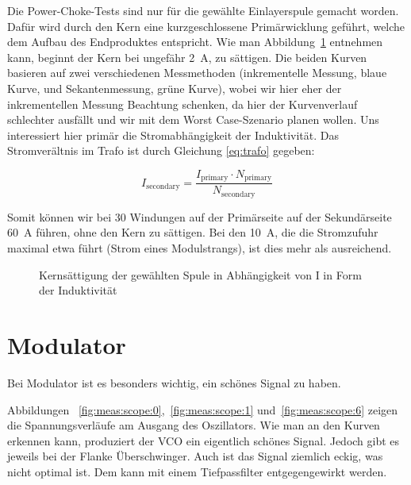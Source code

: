 Die  Power-Choke-Tests sind  nur  f\"ur die  gew\"ahlte Einlayerspule  gemacht
worden. Daf\"ur  wird durch  den Kern  eine kurzgeschlossene  Prim\"arwicklung
gef\"uhrt,   welche   dem   Aufbau  des   Endproduktes   entspricht. Wie   man
Abbildung~\ref{fig:meas:coupling:coil:power_choke:1}  entnehmen kann,  beginnt
der  Kern bei  ungef\"ahr  \SI{2}{\ampere}, zu  s\"attigen. Die beiden  Kurven
basieren   auf  zwei   verschiedenen   Messmethoden  (inkrementelle   Messung,
blaue  Kurve,  und  Sekantenmessung,  gr\"une  Kurve),  wobei  wir  hier  eher
der  inkrementellen  Messung Beachtung  schenken,  da  hier der  Kurvenverlauf
schlechter ausf\"allt und  wir mit dem Worst  Case-Szenario planen wollen. Uns
interessiert  hier prim\"ar  die  Stromabh\"angigkeit der  Induktivit\"at. Das
Stromver\"altnis im Trafo ist durch Gleichung \ref{eq:trafo} gegeben:

\begin{equation}\label{eq:trafo}
    I_{\mathrm{secondary}} = \frac{I_{\mathrm{primary}} \cdot N_{\mathrm{primary}}}{N_{\mathrm{secondary}}}
\end{equation}

Somit  k\"onnen   wir  bei  30   Windungen  auf  der  Prim\"arseite   auf  der
Sekund\"arseite \SI{60}{\ampere}  f\"uhren, ohne  den Kern  zu s\"attigen. Bei
den \SI{10}{\ampere},  die die Stromzufuhr  maximal etwa f\"uhrt  (Strom eines
Modulstrangs), ist dies mehr als ausreichend.

\begin{figure}[h!tb]
    \centering
    
    \caption[Messresultate Kopplungsspule: Kerns\"attigung \"uber Strom]{Kerns\"attigung der gew\"ahlten Spule in Abh\"angigkeit von I in Form der Induktivit\"at}
    \label{fig:meas:coupling:coil:power_choke:1}
\end{figure}


\clearpage
\section{Modulator}
\label{sec:val:modulator}

Bei Modulator ist es besonders wichtig, ein sch\"ones Signal zu haben.

Abbildungen                    ~\ref{fig:meas:scope:0},~\ref{fig:meas:scope:1}
und~\ref{fig:meas:scope:6}  zeigen  die  Spannungsverl\"aufe  am  Ausgang  des
Oszillators.   Wie  man  an  den  Kurven erkennen  kann,  produziert  der  VCO
ein  eigentlich  sch\"ones  Signal. Jedoch  gibt es  jeweils  bei  der  Flanke
\"Uberschwinger. Auch  ist  das  Signal  ziemlich  eckig,  was  nicht  optimal
ist. Dem kann mit einem Tiefpassfilter entgegengewirkt werden.

